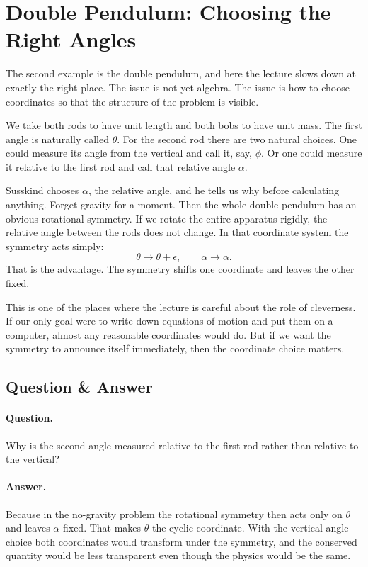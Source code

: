 \section{Double Pendulum: Choosing the Right Angles}

The second example is the double pendulum, and here the lecture slows down at exactly the right place. The issue is not yet algebra. The issue is how to choose coordinates so that the structure of the problem is visible.

We take both rods to have unit length and both bobs to have unit mass. The first angle is naturally called \(\theta\). For the second rod there are two natural choices. One could measure its angle from the vertical and call it, say, \(\phi\). Or one could measure it relative to the first rod and call that relative angle \(\alpha\).

Susskind chooses \(\alpha\), the relative angle, and he tells us why before calculating anything. Forget gravity for a moment. Then the whole double pendulum has an obvious rotational symmetry. If we rotate the entire apparatus rigidly, the relative angle between the rods does not change. In that coordinate system the symmetry acts simply:
\begin{equation}
\theta\to \theta+\epsilon,\qquad \alpha\to \alpha.
\end{equation}
That is the advantage. The symmetry shifts one coordinate and leaves the other fixed.

This is one of the places where the lecture is careful about the role of cleverness. If our only goal were to write down equations of motion and put them on a computer, almost any reasonable coordinates would do. But if we want the symmetry to announce itself immediately, then the coordinate choice matters.

\subsection{Question \& Answer}

\paragraph{Question.} Why is the second angle measured relative to the first rod rather than relative to the vertical?

\paragraph{Answer.} Because in the no-gravity problem the rotational symmetry then acts only on \(\theta\) and leaves \(\alpha\) fixed. That makes \(\theta\) the cyclic coordinate. With the vertical-angle choice both coordinates would transform under the symmetry, and the conserved quantity would be less transparent even though the physics would be the same.

